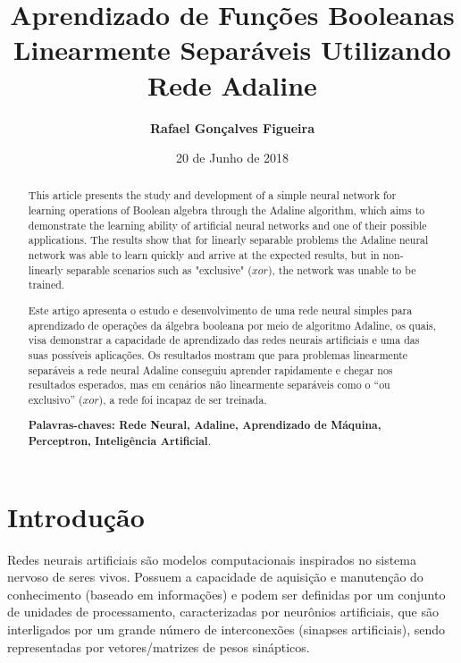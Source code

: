 \documentclass[a4paper,11pt]{article}
\begin{document}
	
	\title{\textbf{Aprendizado de Funções Booleanas Linearmente Separáveis Utilizando Rede Adaline}}
	\author{\textbf{Rafael Gonçalves Figueira}}
	\date{20 de Junho de 2018}
	
	\maketitle
	
	\thispagestyle{empty}
		
	
	\begin{abstract}
		
		This article presents the study and development of a simple neural network for learning operations of Boolean algebra through the Adaline algorithm, which aims to demonstrate the learning ability of artificial neural networks and one of their possible applications. The results show that for linearly separable problems the Adaline neural network was able to learn quickly and arrive at the expected results, but in non-linearly separable scenarios such as "exclusive" ($xor$), the network was unable to be trained.
		
	\end{abstract}

	
	\begin{abstract}
		
		Este artigo apresenta o estudo e desenvolvimento de uma rede neural simples para aprendizado de operações da álgebra booleana por meio de algoritmo Adaline, os quais, visa demonstrar a capacidade de aprendizado das redes neurais artificiais e uma das suas possíveis aplicações. Os resultados mostram que para problemas linearmente separáveis a rede neural Adaline conseguiu aprender rapidamente e chegar nos resultados esperados, mas em cenários não linearmente separáveis como o “ou exclusivo” ($xor$), a rede foi incapaz de ser treinada. 
		
		\textbf{Palavras-chaves: Rede Neural, Adaline, Aprendizado de Máquina, Perceptron, Inteligência Artificial}.
		
	\end{abstract}

	\section{Introdução}
	
		Redes neurais artificiais são modelos computacionais inspirados no sistema nervoso de seres vivos. Possuem a capacidade de aquisição e manutenção do conhecimento (baseado em informações) e podem ser definidas por um conjunto de unidades de processamento, caracterizadas por neurônios artificiais, que são interligados por um grande número de interconexões (sinapses artificiais), sendo representadas por vetores/matrizes de pesos sinápticos. \cite{RedesNeuraisIvanNunes}
		
\end{document}
